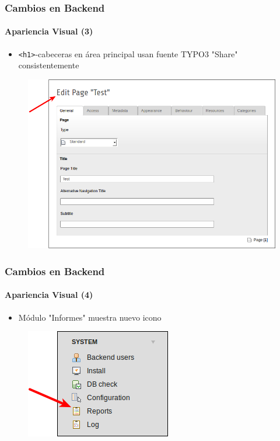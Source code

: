 
\begin{frame}[fragile]
	\frametitle{Cambios en Backend}
	\framesubtitle{Apariencia Visual (3)}

	\begin{itemize}
		\item \texttt{<h1>}-cabeceras en área principal usan fuente TYPO3 "Share" consistentemente
	\end{itemize}

	\begin{figure}
		\includegraphics[width=0.6\linewidth]{Images/BackendChanges/ConsistantFont.png}
	\end{figure}

\end{frame}


\begin{frame}[fragile]
	\frametitle{Cambios en Backend}
	\framesubtitle{Apariencia Visual (4)}

	\begin{itemize}
		\item Módulo "Informes" muestra nuevo icono
	\end{itemize}

	\begin{figure}
		\includegraphics[width=0.35\linewidth]{Images/BackendChanges/ModuleReportsIcon.png}
	\end{figure}

\end{frame}

